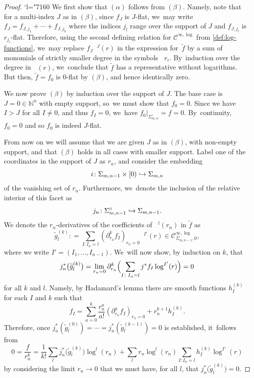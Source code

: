 \documentclass[JEP,XML,SOM,Unicode,NoFloatCountersInSection,published]{cedram}
\newcommand{\Changel}{\mathcode`l="7160}
\newcommand\hto{\mathrel{\lhook\joinrel\to}}
\newcommand{\rBrac}[1]{\Bigl(#1\Bigr)}
\theoremstyle{definition}
\theoremstyle{remark}
\newcommand{\NN}{\mathbb{N}}
\newcommand{\ulog}{\mathop{\widetilde{\log}}\nolimits}
\newcommand{\uf}{\widetilde{f}}
\newcommand{\ug}{\widetilde{g}}
\newcommand{\defas}{\mathrel{\mathop:}=}
\newcommand{\Cinflog}[1]{\mathscr{C}^{\infty,\log}_{#1}}
\newcommand{\cvf}[1]{\partial_{#1}}
\newcommand{\Sig}{\Sigma}
\newcommand{\intSig}{\Sigma^\circ}
\begin{document}
\begin{proof}\Changel
We first show that $(\alpha)$ follows from $(\beta)$. Namely, note that for a multi-index $J$ as in $(\beta)$, since $f_{J}$ is $J$-flat, we~may write $f_{J} = f_{J,j_1} + \cdots + f_{J,j_k}$ where the indices $j_l$ range over the support of $J$ and $f_{J,j_l}$ is $r_{j_l}$-flat.
Therefore, using the second defining relation for $\Cinflog{}$ from \autoref{def:log-functions}, we~may replace $f_{J}\ulog{}\!^J(r)$ in the expression for~$\uf$ by a sum of monomials of strictly smaller degree in the symbols $\ulog r_i$. By~induction over the degree in $\ulog(r)$, we~conclude that $\uf$ has a representative without logarithms. But then, $\uf=f_0$ is $0$-flat by $(\beta)$, and hence identically zero.

We now prove $(\beta)$ by induction over the support of $J$. The base case is $J=0\in\NN^n$ with empty support, so~we must show that $f_0=0$. Since we have $I>J$ for all $I\neq 0$, and thus $f_I=0$, we~have $f_0|_{\intSig_{m,n}}=f=0$. By~continuity, $f_0=0$ and so $f_0$ is indeed $J$-flat.

From now on we will assume that we are given $J$ as in $(\beta)$, with non-empty support, and that $(\beta)$ holds in all cases with smaller support. Label one of the coordinates in the support of $J$ as $r_n$, and consider the embedding
\[
i\colon \Sig_{m,n-1} \times [0) \hto \Sig_{m,n}
\]
of the vanishing set of $r_n$. Furthermore, we~denote the inclusion of the relative interior of this facet as
\begin{equation*}
j_n \colon \intSig_{m,n-1}
\hto \Sig_{m,n-1}
.
\end{equation*}
We denote the $r_n$-derivatives of the coefficients of $\ulog{}\!^l(r_n)$ in $\uf$ as
\begin{equation}\label{eq:r_n-expansion}
\ug_l^{(k)} \defas \sum_{I\colon I_n=l} \left(\cvf{r_n}^k f_{I}\right)_{r_n=0} \ulog{}\!^{I'}(r)
\in \Cinflog{\Sig_{m,n-1},0},
\end{equation}
where we write $I'=(I_1,\ldots,I_{n-1})$. We~will now show, by induction on $k$, that
\begin{equation*}
j_n^* \bigl(\ug_l^{(k)} \bigr)
=\lim_{r_n=0} \cvf{r_n}^k \rBrac{\sum_{I\colon I_n=l} j^*f_I \log^{I'}(r)}
= 0
\end{equation*}
for all $k$ and $l$. Namely, by Hadamard's lemma there are smooth functions $h_I^{(k)}$ for each $I$ and $k$ such that\vspace*{-3pt}
\begin{equation*}
f_I=\sum_{a=0}^{k} \frac{r_n^a}{a!} \left(\cvf{r_n}^a f_I \right)_{r_n=0}
+r_n^{k+1} h_I^{(k)}.
\end{equation*}
Therefore, once $j_n^*(\ug_l^{(0)})=\cdots=j_n^*(\ug_l^{(k-1)})=0$ is established, it~follows from\vspace*{-3pt}
\begin{equation*}
0 = \frac{f}{r_n^k} = \frac{1}{k!}\sum_l j_n^*\bigl(\ug_l^{(k)}\bigr) \log^l(r_n) + \sum_l r_n \log^l(r_n) \sum_{I\colon I_n=l} h_I^{(k)} \log^{I'}(r)
\end{equation*}
by considering the limit $r_n\rightarrow 0$ that we must have, for all $l$, that $j_n^*\big(\ug_l^{(k)}\big)=0$.


\end{proof}
\end{document}
